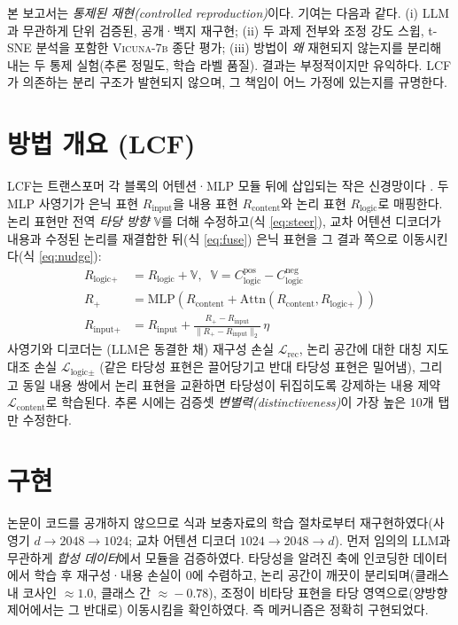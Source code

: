 \documentclass[11pt]{article}
\begin{document}
본 보고서는 \emph{통제된 재현(controlled reproduction)}이다. 기여는 다음과 같다.
(i) LLM과 무관하게 단위 검증된, 공개·백지 재구현;
(ii) 두 과제 전부와 조정 강도 스윕, t-SNE 분석을 포함한 \textsc{Vicuna-7b} 종단 평가;
(iii) 방법이 \emph{왜} 재현되지 않는지를 분리해 내는 두 통제 실험(추론 정밀도, 학습 라벨
품질). 결과는 부정적이지만 유익하다. LCF가 의존하는 분리 구조가 발현되지 않으며, 그
책임이 어느 가정에 있는지를 규명한다.

\section{방법 개요 (LCF)}
LCF는 트랜스포머 각 블록의 어텐션·MLP 모듈 뒤에 삽입되는 작은
신경망이다 \citep{vaswani2017attention}. 두 MLP 사영기가 은닉 표현
$R_{\text{input}}$을 내용 표현 $R_{\text{content}}$와 논리 표현 $R_{\text{logic}}$로
매핑한다. 논리 표현만 전역 \emph{타당 방향} $\mathbb{V}$를 더해 수정하고(식
\ref{eq:steer}), 교차 어텐션 디코더가 내용과 수정된 논리를 재결합한 뒤(식
\ref{eq:fuse}) 은닉 표현을 그 결과 쪽으로 이동시킨다(식 \ref{eq:nudge}):
\begin{align}
R_{\text{logic}+} &= R_{\text{logic}} + \mathbb{V},\;\;
\mathbb{V} = C^{\text{pos}}_{\text{logic}} - C^{\text{neg}}_{\text{logic}}
\label{eq:steer}\\
R_{+} &= \mathrm{MLP}\!\left(R_{\text{content}} + \mathrm{Attn}(R_{\text{content}}, R_{\text{logic}+})\right)
\label{eq:fuse}\\
R_{\text{input}+} &= R_{\text{input}} + \tfrac{R_{+}-R_{\text{input}}}{\lVert R_{+}-R_{\text{input}}\rVert_2}\,\eta
\label{eq:nudge}
\end{align}
사영기와 디코더는 (LLM은 동결한 채) 재구성 손실 $\mathcal{L}_{\text{rec}}$, 논리 공간에
대한 대칭 지도 대조 손실 $\mathcal{L}_{\text{logic}\pm}$ \citep{wang2020understanding}
(같은 타당성 표현은 끌어당기고 반대 타당성 표현은 밀어냄), 그리고 동일 내용 쌍에서 논리
표현을 교환하면 타당성이 뒤집히도록 강제하는 내용 제약 $\mathcal{L}_{\text{content}}$로
학습된다. 추론 시에는 검증셋 \emph{변별력(distinctiveness)}이 가장 높은 10개 탭만
수정한다.

\section{구현}
논문이 코드를 공개하지 않으므로 식과 보충자료의 학습 절차로부터 재구현하였다(사영기
$d\!\to\!2048\!\to\!1024$; 교차 어텐션 디코더 $1024\!\to\!2048\!\to\!d$). 먼저 임의의
LLM과 무관하게 \emph{합성 데이터}에서 모듈을 검증하였다. 타당성을 알려진 축에 인코딩한
데이터에서 학습 후 재구성·내용 손실이 0에 수렴하고, 논리 공간이 깨끗이
분리되며(클래스 내 코사인 $\approx\!1.0$, 클래스 간 $\approx\!-0.78$), 조정이 비타당
표현을 타당 영역으로(양방향 제어에서는 그 반대로) 이동시킴을 확인하였다. 즉 메커니즘은
정확히 구현되었다.
\end{document}

